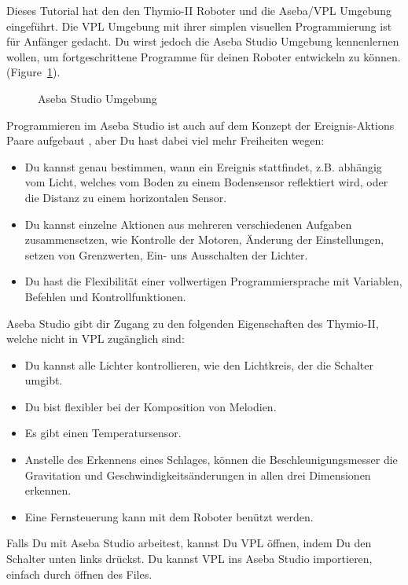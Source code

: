 
Dieses Tutorial hat den den Thymio-II Roboter und die Aseba/VPL Umgebung eingeführt. Die VPL Umgebung mit ihrer simplen visuellen Programmierung ist für Anfänger gedacht. Du wirst jedoch die Aseba Studio Umgebung kennenlernen wollen, um fortgeschrittene Programme für deinen Roboter entwickeln zu können. (Figure~\ref{fig.studio}).

\begin{figure}[hbt]
\begin{center}
\caption{Aseba Studio Umgebung}
\label{fig.studio}
\end{center}
\end{figure}

Programmieren im Aseba Studio ist auch auf dem Konzept der Ereignis-Aktions Paare aufgebaut , aber Du hast dabei viel mehr Freiheiten wegen:

\begin{itemize}
\item Du kannst genau bestimmen, wann ein Ereignis stattfindet, z.B. abhängig vom Licht, welches vom Boden zu einem Bodensensor reflektiert wird, oder die Distanz zu einem horizontalen Sensor.
\item  Du kannst einzelne Aktionen aus mehreren verschiedenen Aufgaben zusammensetzen, wie Kontrolle der Motoren, Änderung der Einstellungen, setzen von Grenzwerten, Ein- uns Ausschalten der Lichter.
\item  Du hast die Flexibilität einer vollwertigen Programmiersprache mit Variablen, Befehlen und Kontrollfunktionen.

\end{itemize}

Aseba Studio gibt dir Zugang zu den folgenden Eigenschaften des Thymio-II, welche nicht in VPL zugänglich sind:

\begin{itemize}
\item Du kannst alle Lichter kontrollieren, wie den Lichtkreis, der die Schalter umgibt.
\item Du bist flexibler bei der Komposition von Melodien.
\item Es gibt einen Temperatursensor.
\item Anstelle des Erkennens eines Schlages, können die Beschleunigungsmesser die Gravitation und Geschwindigkeitsänderungen in allen drei Dimensionen erkennen. 
\item Eine Fernsteuerung kann mit dem Roboter benützt werden.
\end{itemize}

Falls Du mit Aseba Studio arbeitest, kannst Du VPL öffnen, indem Du den Schalter  unten links drückst. Du kannst VPL ins Aseba Studio importieren, einfach durch öffnen des Files.

\bigskip\bigskip\bigskip\bigskip

